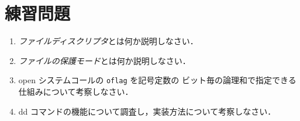 \section*{練習問題}
\begin{enumerate}

\item \emph{ファイルディスクリプタ}とは何か説明しなさい．

\item \emph{ファイルの保護モード}とは何か説明しなさい．

\item open システムコールの \texttt{oflag} を記号定数の
ビット毎の論理和で指定できる仕組みについて考察しなさい．

\item dd コマンドの機能について調査し，実装方法について考察しなさい．
\end{enumerate}
